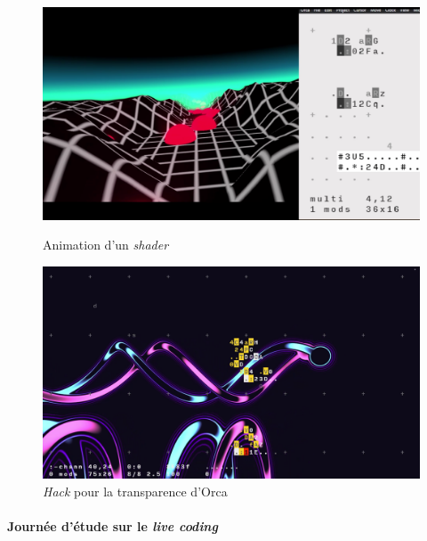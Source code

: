\begin{figure}[h]
  \begin{minipage}[b]{0.45\linewidth}
    \centering
    \includegraphics[width=\linewidth]{images/experiments/experim03.png}
    \caption{Animation d'un \textit{shader}}
    \label{experim03}
  \end{minipage}
  \hspace{0.1\linewidth} %
  \begin{minipage}[b]{0.45\linewidth}
    \centering
    \includegraphics[width=\linewidth]{images/experiments/experim02.png}
    \caption{\textit{Hack} pour la transparence d'Orca}
    \label{experim02}
  \end{minipage}
\end{figure}




\paragraph*{Journée d'étude sur le \textit{live coding}}


